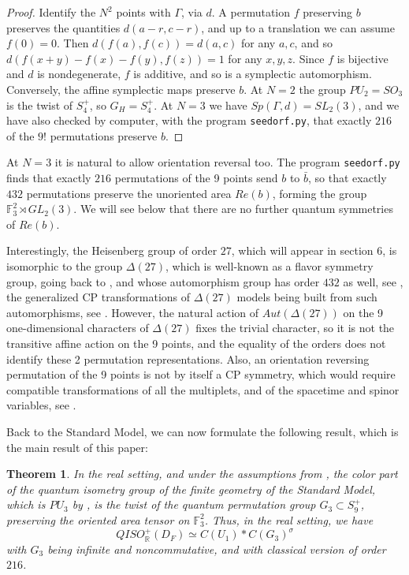 \documentclass[11pt]{amsart}
\newtheorem{theorem}{Theorem}[section]
\theoremstyle{definition}
\begin{document}
\begin{proof}
Identify the $N^2$ points with $\Gamma$, via $d$. A permutation $f$ preserving $b$ preserves the quantities $d(a-r,c-r)$, and up to a translation we can assume $f(0)=0$. Then $d(f(a),f(c))=d(a,c)$ for any $a,c$, and so $d(f(x+y)-f(x)-f(y),f(z))=1$ for any $x,y,z$. Since $f$ is bijective and $d$ is nondegenerate, $f$ is additive, and so is a symplectic automorphism. Conversely, the affine symplectic maps preserve $b$. At $N=2$ the group $PU_2=SO_3$ is the twist of $S_4^+$, so $G_H=S_4^+$. At $N=3$ we have $Sp(\Gamma,d)=SL_2(3)$, and we have also checked by computer, with the program {\tt seedorf.py}, that exactly $216$ of the $9!$ permutations preserve $b$.
\end{proof}

At $N=3$ it is natural to allow orientation reversal too. The program {\tt seedorf.py} finds that exactly $216$ permutations of the 9 points send $b$ to $\bar{b}$, so that exactly $432$ permutations preserve the unoriented area $Re(b)$, forming the group $\mathbb F_3^2\rtimes GL_2(3)$. We will see below that there are no further quantum symmetries of $Re(b)$.

Interestingly, the Heisenberg group of order $27$, which will appear in section 6, is isomorphic to the group $\Delta(27)$, which is well-known as a flavor symmetry group, going back to \cite{bgg}, and whose automorphism group has order $432$ as well, see \cite{hls}, the generalized CP transformations of $\Delta(27)$ models being built from such automorphisms, see \cite{cpv,hls}. However, the natural action of $Aut(\Delta(27))$ on the 9 one-dimensional characters of $\Delta(27)$ fixes the trivial character, so it is not the transitive affine action on the 9 points, and the equality of the orders does not identify these 2 permutation representations. Also, an orientation reversing permutation of the 9 points is not by itself a CP symmetry, which would require compatible transformations of all the multiplets, and of the spacetime and spinor variables, see \cite{cpv}.

Back to the Standard Model, we can now formulate the following result, which is the main result of this paper:

\begin{theorem}
In the real setting, and under the assumptions from \cite[section 3.1]{bdd}, the color part of the quantum isometry group of the finite geometry of the Standard Model, which is $PU_3$ by \cite{bdd}, is the twist of the quantum permutation group $G_3\subset S_9^+$, preserving the oriented area tensor on $\mathbb F_3^2$. Thus, in the real setting, we have
$$QISO^+_{\mathbb R}(D_F)\simeq C(U_1)*C(G_3)^\sigma$$
with $G_3$ being infinite and noncommutative, and with classical version of order $216$.
\end{theorem}
\end{document}
